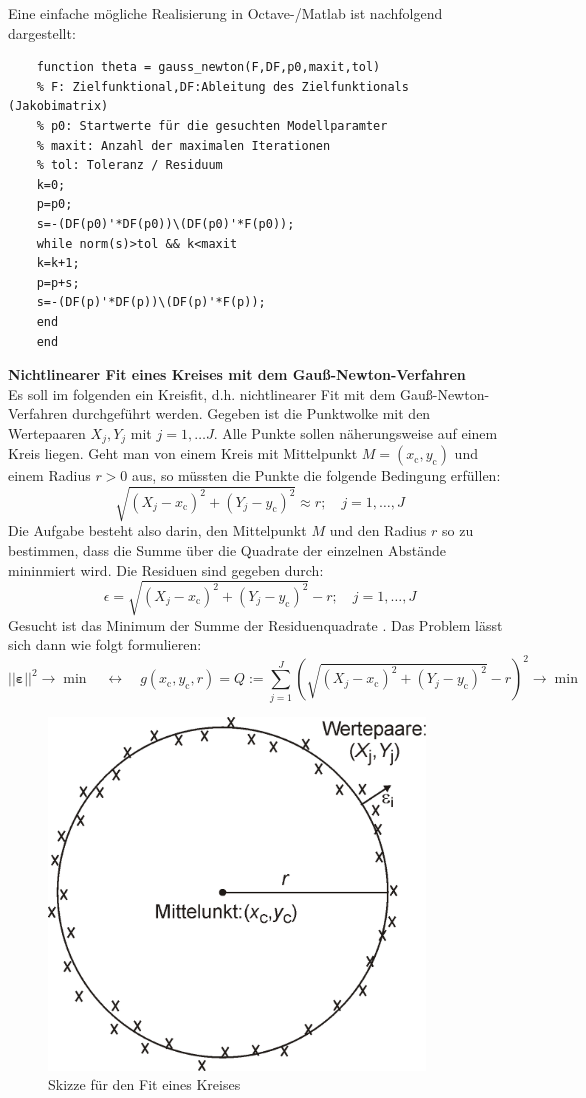 Eine einfache mögliche Realisierung in Octave-/Matlab ist nachfolgend dargestellt:
\begin{verbatim}
	function theta = gauss_newton(F,DF,p0,maxit,tol)
	% F: Zielfunktional,DF:Ableitung des Zielfunktionals (Jakobimatrix)
	% p0: Startwerte für die gesuchten Modellparamter 
	% maxit: Anzahl der maximalen Iterationen
	% tol: Toleranz / Residuum   
	k=0;
	p=p0;
	s=-(DF(p0)'*DF(p0))\(DF(p0)'*F(p0));
	while norm(s)>tol && k<maxit
	k=k+1;
	p=p+s;
	s=-(DF(p)'*DF(p))\(DF(p)'*F(p));
	end
	end
\end{verbatim} 
\textbf{Nichtlinearer Fit eines Kreises mit dem Gauß-Newton-Verfahren} \\
Es soll im folgenden ein Kreisfit, d.h. nichtlinearer Fit mit dem Gauß-Newton-Verfahren durchgeführt werden.
Gegeben ist die Punktwolke mit den Wertepaaren $X_j,Y_j$ mit $j =1,\ldots J$. 
Alle Punkte sollen näherungsweise auf einem Kreis liegen. 
Geht man von einem Kreis mit Mittelpunkt $M=(x_\mathrm{c},y_\mathrm{c})$ und einem Radius
$r>0$ aus, so müssten die Punkte die folgende Bedingung erfüllen:
\begin{equation}
	\sqrt{(X_j-x_\mathrm{c})^2+(Y_j-y_\mathrm{c})^2} \approx r; \quad j=1,\ldots,J
	\label{eq:Bedingung}
\end{equation}
Die Aufgabe besteht also darin, den Mittelpunkt $M$ und den Radius $r$
so zu bestimmen, dass die Summe über die Quadrate der einzelnen Abstände
mininmiert wird. Die Residuen sind gegeben durch: 
\begin{equation}
	\epsilon = \sqrt{(X_j-x_\mathrm{c})^2+(Y_j-y_\mathrm{c})^2} - r ; \quad j=1,\ldots,J
\end{equation}
Gesucht ist das Minimum der Summe der Residuenquadrate . Das Problem lässt sich 
dann wie folgt formulieren: 
\begin{equation}
	||\boldsymbol \varepsilon||^2 \rightarrow \min  \quad \leftrightarrow \quad
	g(x_\mathrm{c},y_\mathrm{c},r) = Q := \sum_{j=1}^{J} \left( \sqrt{(X_j-x_\mathrm{c})^2+(Y_j-y_\mathrm{c})^2}-r\right)^2
	\rightarrow \min
\end{equation}
\begin{figure}[!htp]
	\begin{center}
		\includegraphics[width=100mm]{03_vorlesung/media/KreisfitSkizze.png}
		\caption{Skizze für den Fit eines Kreises}
		\label{fig:KreisfitSkizze}
	\end{center}
\end{figure}
